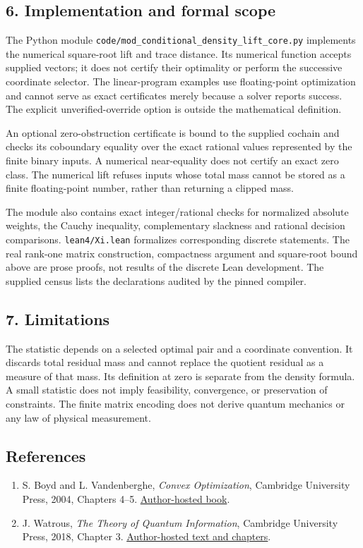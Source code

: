 \documentclass[
]{article}
\providecommand{\tightlist}{%
  \setlength{\itemsep}{0pt}\setlength{\parskip}{0pt}}
\begin{document}
\subsection{6. Implementation and formal
scope}\label{implementation-and-formal-scope}

The Python module \nolinkurl{code/mod_conditional_density_lift_core.py}
implements the numerical square-root lift and trace distance. Its
numerical function accepts supplied vectors; it does not certify their
optimality or perform the successive coordinate selector. The
linear-program examples use floating-point optimization and cannot serve
as exact certificates merely because a solver reports success. The
explicit unverified-override option is outside the mathematical
definition.

An optional zero-obstruction certificate is bound to the supplied
cochain and checks its coboundary equality over the exact rational
values represented by the finite binary inputs. A numerical
near-equality does not certify an exact zero class. The numerical lift
refuses inputs whose total mass cannot be stored as a finite
floating-point number, rather than returning a clipped mass.

The module also contains exact integer/rational checks for normalized
absolute weights, the Cauchy inequality, complementary slackness and
rational decision comparisons. \nolinkurl{lean4/Xi.lean} formalizes
corresponding discrete statements. The real rank-one matrix
construction, compactness argument and square-root bound above are prose
proofs, not results of the discrete Lean development. The supplied
census lists the declarations audited by the pinned compiler.

\subsection{7. Limitations}\label{limitations}

The statistic depends on a selected optimal pair and a coordinate
convention. It discards total residual mass and cannot replace the
quotient residual as a measure of that mass. Its definition at zero is
separate from the density formula. A small statistic does not imply
feasibility, convergence, or preservation of constraints. The finite
matrix encoding does not derive quantum mechanics or any law of physical
measurement.

\subsection{References}\label{references}

\begin{enumerate}
\def\labelenumi{\arabic{enumi}.}
\tightlist
\item
  S. Boyd and L. Vandenberghe, \emph{Convex Optimization}, Cambridge
  University Press, 2004, Chapters 4--5.
  \href{https://web.stanford.edu/~boyd/cvxbook/}{Author-hosted book}.
\item
  J. Watrous, \emph{The Theory of Quantum Information}, Cambridge
  University Press, 2018, Chapter 3.
  \href{https://cs.uwaterloo.ca/~watrous/TQI/}{Author-hosted text and
  chapters}.
\end{enumerate}
\end{document}
